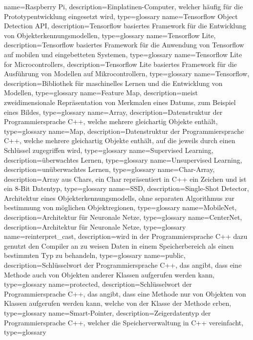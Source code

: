{
	name=Raspberry Pi,
	description={Einplatinen-Computer, welcher häufig für die Prototypentwicklung eingesetzt wird},
    type=glossary
}
{
	name=Tensorflow Object Detection API,
	description={Tensorflow basiertes Framework für die Entwicklung von Objekterkennungsmodellen},
    type=glossary
}
{
	name=Tensorflow Lite,
	description={Tensorflow basiertes Framework für die Anwendung von Tensorflow auf mobilen und eingebetteten Systemen},
    type=glossary
}
{
	name=Tensorflow Lite for Microcontrollers,
	description={Tensorflow Lite basiertes Framework für die Ausführung von Modellen auf Mikrocontrollern},
    type=glossary
}
{
	name=Tensorflow,
	description={Bibliothek für maschinelles Lernen und die Entwicklung von Modellen},
    type=glossary
}
{
	name=Feature Map,
	description={meist zweidimensionale Repräsentation von Merkmalen eines Datums, zum Beispiel eines Bildes},
    type=glossary
}
{
	name=Array,
	description={Datenstruktur der Programmiersprache C++, welche mehrere gleichartig Objekte enthält},
    type=glossary
}
{
	name=Map,
	description={Datenstruktur der Programmiersprache C++, welche mehrere gleichartig Objekte enthält, auf die jeweils durch einen Schlüssel zugegriffen wird},
    type=glossary
}
{
	name=Supervised Learning,
	description={überwachtes Lernen},
    type=glossary
}
{
	name=Unsupervised Learning,
	description={unüberwachtes Lernen},
    type=glossary
}
{
	name=Char-Array,
	description={Array aus Chars, ein Char repräsentiert in C++ ein Zeichen und ist ein 8-Bit Datentyp},
    type=glossary
}
{
	name=SSD,
	description={Single-Shot Detector, Architektur eines Objekterkennungsmodells, ohne separaten Algorithmus zur bestimmung von möglichen Objektregionen},
    type=glossary
}
{
	name=MobileNet,
	description={Architektur für Neuronale Netze},
    type=glossary
}
{
	name=CenterNet,
	description={Architektur für Neuronale Netze},
    type=glossary
}
{
	name=reinterpret\_cast,
	description={wird in der Programmiersprache C++ dazu genutzt den Compiler an zu weisen Daten in einem Speicherbereich als einen bestimmten Typ zu behandeln},
    type=glossary
}
{
	name=public,
	description={Schlüsselwort der Programmiersprache C++, das angibt, dass eine Methode auch von Objekten anderer Klassen aufgerufen werden kann},
    type=glossary
}
{
	name=protected,
	description={Schlüsselwort der Programmiersprache C++, das angibt, dass eine Methode nur von Objekten von Klassen aufgerufen werden kann, welche von der Klasse der Methode erben},
    type=glossary
}
{
	name=Smart-Pointer,
	description={Zeigerdatentyp der Programmiersprache C++, welcher die Speicherverwaltung in C++ vereinfacht},
    type=glossary
}